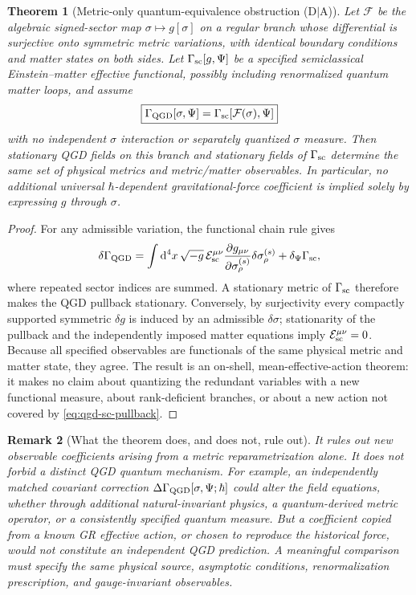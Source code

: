 \documentclass[11pt,a4paper]{article}
\newtheorem{theorem}{Theorem}[section]
\newtheorem{remark}[theorem]{Remark}
\newcommand{\dd}{\mathrm d}
\begin{document}
\begin{theorem}[Metric-only quantum-equivalence obstruction (D$\mid$A)]
\label{thm:quantumno-go}
Let $\mathcal F$ be the algebraic signed-sector map $\sigma\mapsto
g[\sigma]$ on a regular branch whose differential is surjective onto
symmetric metric variations, with identical boundary conditions and
matter states on both sides. Let $\Gamma_{\rm sc}[g,\Psi]$ be a
specified semiclassical Einstein--matter effective functional,
possibly including renormalized quantum matter loops, and assume
\begin{equation}\label{eq:qgd-sc-pullback}
\boxed{\Gamma_{\rm QGD}[\sigma,\Psi]
=\Gamma_{\rm sc}[\mathcal F(\sigma),\Psi]}
\end{equation}
with no independent $\sigma$ interaction or separately quantized
$\sigma$ measure. Then stationary QGD fields on this branch and
stationary fields of $\Gamma_{\rm sc}$ determine the same set of
physical metrics and metric/matter observables. In particular, no
additional universal $\hbar$-dependent gravitational-force coefficient
is implied solely by expressing $g$ through $\sigma$.
\end{theorem}
\begin{proof}
For any admissible variation, the functional chain rule gives
\begin{equation}\label{eq:quantum-pullback-chain}
\delta\Gamma_{\rm QGD}
=\int\dd^4x\,\sqrt{-g}\,\mathcal E_{\rm sc}^{\mu\nu}
\frac{\partial g_{\mu\nu}}{\partial\sigma^{(s)}_\rho}
\delta\sigma^{(s)}_\rho
+\delta_\Psi\Gamma_{\rm sc},
\end{equation}
where repeated sector indices are summed. A stationary metric of
$\Gamma_{\rm sc}$ therefore makes the QGD pullback stationary.
Conversely, by surjectivity every compactly supported symmetric
$\delta g$ is induced by an admissible $\delta\sigma$; stationarity
of the pullback and the independently imposed matter equations imply
$\mathcal E_{\rm sc}^{\mu\nu}=0$. Because all specified observables
are functionals of the same physical metric and matter state, they
agree. The result is an on-shell, mean-effective-action theorem: it
makes no claim about quantizing the redundant variables with a new
functional measure, about rank-deficient branches, or about a
new action not covered by \eqref{eq:qgd-sc-pullback}.
\end{proof}

\begin{remark}[What the theorem does, and does not, rule out]
It rules out \emph{new observable coefficients arising from a metric
reparametrization alone}. It does not forbid a distinct QGD quantum
mechanism. For example, an independently matched covariant correction
$\Delta\Gamma_{\rm QGD}[\sigma,\Psi;\hbar]$ could alter the field
equations, whether through additional natural-invariant physics, a
quantum-derived metric operator, or a consistently specified quantum
measure. But a coefficient copied from a known GR effective action,
or chosen to reproduce the historical force, would not constitute an
independent QGD prediction. A meaningful comparison must specify
the same physical source, asymptotic conditions, renormalization
prescription, and gauge-invariant observables.
\end{remark}
\end{document}
